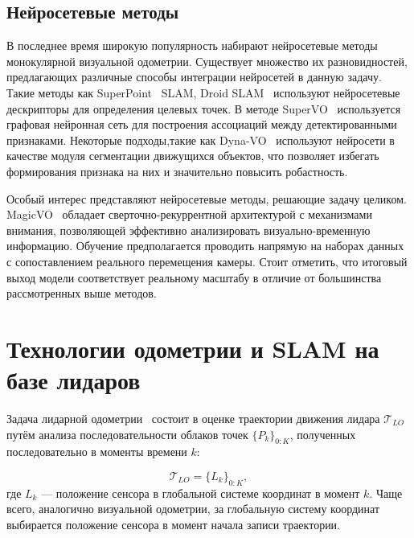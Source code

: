 \subsection{Нейросетевые методы}
В последнее время широкую популярность набирают нейросетевые методы монокулярной
визуальной одометрии. Существует множество их разновидностей, предлагающих различные
способы интеграции нейросетей в данную задачу. Такие методы как SuperPoint~\cite{detone2018superpoint} SLAM, Droid SLAM~\cite{teed2021droid}
используют нейросетевые дескрипторы для определения целевых точек. В методе SuperVO~\cite{rao2021supervo} используется
графовая нейронная сеть для построения ассоциаций между детектированными признаками. 
Некоторые подходы,такие как Dyna-VO~\cite{ma2021dyna} используют нейросети в качестве модуля сегментации
движущихся объектов, что позволяет избегать формирования признака на них и значительно 
повысить робастность.

Особый интерес представляют нейросетевые методы, решающие задачу целиком. MagicVO~\cite{jiao2019magicvo} обладает
сверточно-рекуррентной архитектурой с механизмами внимания, позволяющей эффективно 
анализировать визуально-временную информацию. Обучение предполагается проводить напрямую
на наборах данных с сопоставлением реального перемещения камеры. Стоит отметить, что
итоговый выход модели соответствует реальному масштабу в отличие от большинства рассмотренных
выше методов. 

\section{Технологии одометрии и SLAM на базе лидаров}

Задача лидарной одометрии~\cite{lee2024lidar} состоит в оценке траектории движения лидара 
$\mathcal{T}_{LO}$ путём анализа последовательности облаков точек 
$\{{P}_k\}_{0:K}$, полученных последовательно в моменты времени $k$:

\begin{equation*}
    \mathcal{T}_{LO} = \{ L_k \}_{0:K},
\end{equation*}
где $L_k$ --- положение сенсора в глобальной системе координат в момент $k$. Чаще 
всего, аналогично визуальной одометрии, за глобальную систему координат выбирается положение сенсора в 
момент начала записи траектории.

